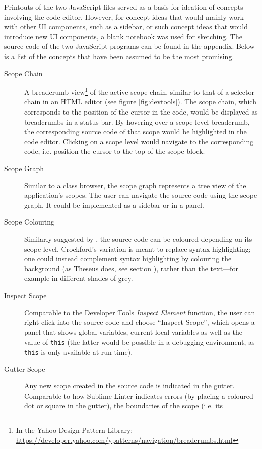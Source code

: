Printouts of the two JavaScript files served as a basis for ideation of
concepts involving the code editor. However, for concept ideas that
would mainly work with other UI components, such as a sidebar, or such
concept ideas that would introduce new UI components, a blank notebook
was used for sketching. The source code of the two JavaScript programs
can be found in the appendix. Below is a list of the concepts that have
been assumed to be the most promising.

\begin{description}
\item[Scope Chain]
A breadcrumb
view\footnote{In the Yahoo Design Pattern Library: \url{https://developer.yahoo.com/ypatterns/navigation/breadcrumbs.html}}
of the active scope chain, similar to that of a selector chain in an
HTML editor (see figure \ref{fig:devtools}). The scope chain, which
corresponds to the position of the cursor in the code, would be
displayed as \gls{breadcrumbs} in a status bar. By hovering over a scope
level breadcrumb, the corresponding source code of that scope would be
highlighted in the code editor. Clicking on a scope level would navigate
to the corresponding code, i.e. position the cursor to the top of the
scope block.
\item[Scope Graph]
Similar to a class browser, the scope graph represents a tree view of
the application’s scopes. The user can navigate the source code using
the scope graph. It could be implemented as a sidebar or in a panel.
\item[Scope Colouring]
Similarly suggested by , the source code can be
coloured depending on its scope level. Crockford’s variation is meant to
replace syntax highlighting; one could instead complement syntax
highlighting by colouring the background (as Theseus does, see section
), rather than the text—for example in different shades
of grey.
\item[Inspect Scope]
Comparable to the Developer Tools \emph{Inspect Element} function, the
user can right-click into the source code and choose “Inspect Scope”,
which opens a panel that shows global variables, current local variables
as well as the value of \texttt{this} (the latter would be possible in a
debugging environment, as \texttt{this} is only available at run-time).
\item[Gutter Scope]
Any new scope created in the source code is indicated in the gutter.
Comparable to how Sublime Linter indicates errors (by placing a coloured
dot or square in the gutter), the boundaries of the scope (i.e. its

\end{description}
